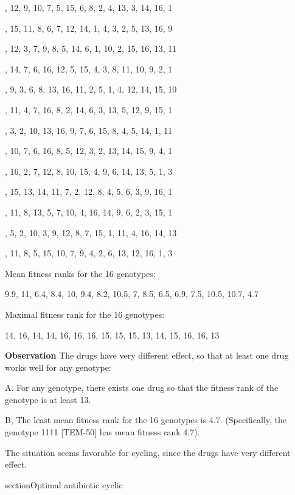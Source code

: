 \documentclass[12pt]{amsart}
\theoremstyle{plain}
\theoremstyle{definition}
\begin{document}
{, 12, 9, 10, 7, 5, 15, 6, 8, 2, 4, 13, 3, 14, 16, 1



, 15, 11, 8, 6, 7, 12, 14, 1, 4, 3, 2, 5, 13, 16, 9



, 12, 3, 7, 9, 8, 5, 14, 6, 1, 10, 2, 15, 16, 13, 11

, 14, 7, 6, 16, 12, 5, 15, 4, 3, 8, 11, 10, 9, 2, 1


, 9, 3, 6, 8, 13, 16, 11, 2, 5, 1, 4, 12, 14, 15, 10


, 11, 4, 7, 16, 8, 2, 14, 6, 3, 13, 5, 12, 9, 15, 1


, 3, 2, 10, 13, 16, 9, 7, 6, 15, 8, 4, 5, 14, 1, 11


, 10, 7, 6, 16, 8, 5, 12, 3, 2, 13, 14, 15, 9, 4, 1

, 16, 2, 7, 12, 8, 10, 15, 4, 9, 6, 14, 13, 5, 1, 3

, 15, 13, 14, 11, 7, 2, 12, 8, 4, 5, 6, 3, 9, 16, 1

, 11, 8, 13, 5, 7, 10, 4, 16, 14, 9, 6, 2, 3, 15, 1

, 5, 2, 10, 3, 9, 12, 8, 7, 15, 1, 11, 4, 16, 14, 13


, 11, 8, 5, 15, 10, 7, 9, 4, 2, 6, 13, 12, 16, 1, 3



\bigskip
Mean fitness ranks for the 16 genotypes:

9.9, 11, 6.4, 8.4, 10, 9.4, 8.2, 10.5, 7, 8.5, 6.5, 6.9, 7.5, 10.5, 10.7, 4.7

\bigskip
Maximal fitness rank for the 16 genotypes:

14, 16, 14, 14, 16, 16, 16, 15, 15, 15, 13, 14, 15, 16, 16, 13


\bigskip
\noindent
{\bf{Observation}}
The drugs have very different effect, so that at least one
drug works well for any genotype:

A. For any genotype, there exists one drug
so that the fitness rank of the genotype is at least 13.

B, The least mean fitness rank for the 16 genotypes
is 4.7. (Specifically, the genotype 1111 [TEM-50]
has mean fitness rank 4.7).

The situation seems favorable 
for cycling, since the drugs have very different effect.





section{Optimal antibiotic cyclic}


}
\end{document}
